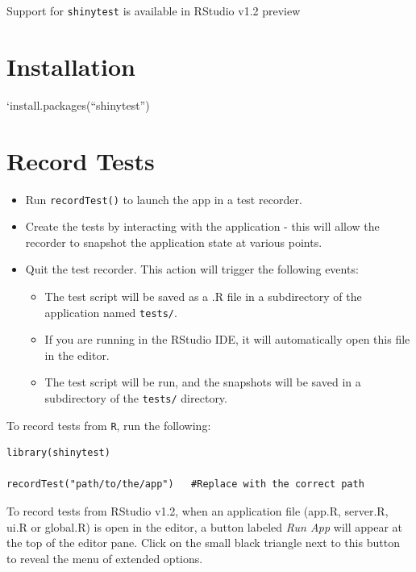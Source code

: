 \documentclass[]{book}
\providecommand{\tightlist}{%
  \setlength{\itemsep}{0pt}\setlength{\parskip}{0pt}}
\begin{document}
Support for \texttt{shinytest} is available in RStudio v1.2 preview

\hypertarget{installation}{%
\section{Installation}\label{installation}}

`install.packages(``shinytest'')

\hypertarget{record-tests}{%
\section{Record Tests}\label{record-tests}}

\begin{itemize}
\tightlist
\item
  Run \texttt{recordTest()} to launch the app in a test recorder.
\item
  Create the tests by interacting with the application - this will allow
  the recorder to snapshot the application state at various points.
\item
  Quit the test recorder. This action will trigger the following events:

  \begin{itemize}
  \tightlist
  \item
    The test script will be saved as a .R file in a subdirectory of the
    application named \texttt{tests/}.
  \item
    If you are running in the RStudio IDE, it will automatically open
    this file in the editor.
  \item
    The test script will be run, and the snapshots will be saved in a
    subdirectory of the \texttt{tests/} directory.
  \end{itemize}
\end{itemize}

To record tests from \texttt{R}, run the following:

\begin{verbatim}
library(shinytest)

recordTest("path/to/the/app")   #Replace with the correct path
\end{verbatim}

To record tests from RStudio v1.2, when an application file (app.R,
server.R, ui.R or global.R) is open in the editor, a button labeled
\emph{Run App} will appear at the top of the editor pane. Click on the
small black triangle next to this button to reveal the menu of extended
options.
\end{document}
